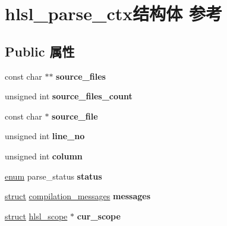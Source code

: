 \hypertarget{structhlsl__parse__ctx}{}\section{hlsl\+\_\+parse\+\_\+ctx结构体 参考}
\label{structhlsl__parse__ctx}
\subsection*{Public 属性}
\begin{DoxyCompactItemize}
\item 
\mbox{\label{structhlsl__parse__ctx_aa28b414ae6e3fc7ead09a2e15dcafaf6}} 
const char $\ast$$\ast$ {\bfseries source\+\_\+files}
\item 
\mbox{\label{structhlsl__parse__ctx_a2bce72fa6dee69dbbbb202a93b8db656}} 
unsigned int {\bfseries source\+\_\+files\+\_\+count}
\item 
\mbox{\label{structhlsl__parse__ctx_ac5fbb6527552232de5b805438b9b83a4}} 
const char $\ast$ {\bfseries source\+\_\+file}
\item 
\mbox{\label{structhlsl__parse__ctx_add03ee139ab6b76cdb1a5a84f3d75259}} 
unsigned int {\bfseries line\+\_\+no}
\item 
\mbox{\label{structhlsl__parse__ctx_a2bcfbaf8933fb42e5cdc57d546cb882d}} 
unsigned int {\bfseries column}
\item 
\mbox{\label{structhlsl__parse__ctx_a672fd4408edfb80ea8e3b17a823cd8b2}} 
\hyperlink{interfaceenum}{enum} parse\+\_\+status {\bfseries status}
\item 
\mbox{\label{structhlsl__parse__ctx_acdd94703ea9854c4d98fcaf61b54c991}} 
\hyperlink{interfacestruct}{struct} \hyperlink{structcompilation__messages}{compilation\+\_\+messages} {\bfseries messages}
\item 
\mbox{\label{structhlsl__parse__ctx_a84cce63715b1d49c89325e195552c783}} 
\hyperlink{interfacestruct}{struct} \hyperlink{structhlsl__scope}{hlsl\+\_\+scope} $\ast$ {\bfseries cur\+\_\+scope}
$$
\end{DoxyCompactItemize}
